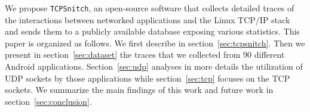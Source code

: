 We propose \texttt{TCPSnitch}, an open-source software that collects
detailed traces of the interactions between networked applications and
the Linux TCP/IP stack and sends them to a publicly available database exposing
various statistics. This paper is organized as follows. We first
describe \tcpsnitch in section~\ref{sec:tcpsnitch}. Then we present in
section~\ref{sec:dataset} the traces that we collected from 90
different Android applications. Section~\ref{sec:udp} analyses in more
details the utilization of UDP sockets by those applications while
section~\ref{sec:tcp} focuses on the TCP sockets. We summarize the
main findings of this work and future work in section~\ref{sec:conclusion}.

